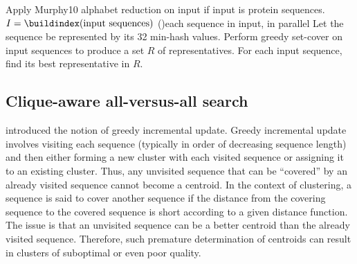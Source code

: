 \documentclass[11pt,letterpaper]{llncs2e/llncs}
\begin{document}
\begin{algorithm}
	Apply Murphy10 alphabet reduction on input if input is protein sequences.\;
	\(I=\buildindex(\textnormal{input sequences})\) \;
	\For(){each sequence in input, in parallel}{
		Let the sequence be represented by its 32 min-hash values. \;
	}
	Perform greedy set-cover on input sequences to produce a set \(R\) of representatives.\;
	For each input sequence, find its best representative in \(R\).\;
	\;
\end{algorithm}

\subsection{Clique-aware all-versus-all search}
\label{subsec:clique-aware}
 introduced the notion of greedy incremental update.
Greedy incremental update involves visiting each sequence (typically in order of decreasing sequence length) and then either forming a new cluster with each visited sequence or assigning it to an existing cluster. Thus, any unvisited sequence that can be ``covered'' by an already visited sequence cannot become a centroid. 
In the context of clustering, 
	a sequence is said to cover another sequence if the distance from the covering sequence to the covered sequence is short according to a given distance function. 
The issue is that an unvisited sequence can be a better centroid than the already visited sequence. 
Therefore, such premature determination of centroids can result in clusters of suboptimal or even poor quality.
\end{document}
